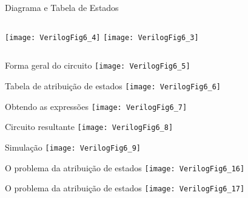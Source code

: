 \begin{frame}{Diagrama e Tabela de Estados} \centering
	\begin{columns}
        \vspace{3cm}
        \texttt{[image: VerilogFig6\_4]}
        \texttt{[image: VerilogFig6\_3]}
	\end{columns}
\end{frame}

\begin{frame}{Forma geral do circuito} \centering
    \texttt{[image: VerilogFig6\_5]} 
\end{frame}

\begin{frame}{Tabela de atribuição de estados} \centering
    \texttt{[image: VerilogFig6\_6]} 
\end{frame}

\begin{frame}{Obtendo as expressões} \centering
    \texttt{[image: VerilogFig6\_7]} 
\end{frame}

\begin{frame}{Circuito resultante} \centering
    \texttt{[image: VerilogFig6\_8]} 
\end{frame}

\begin{frame}{Simulação} \centering
    \texttt{[image: VerilogFig6\_9]} 
\end{frame}

\begin{frame}{O problema da atribuição de estados} \centering
    \texttt{[image: VerilogFig6\_16]} 
\end{frame}

\begin{frame}{O problema da atribuição de estados} \centering
    \texttt{[image: VerilogFig6\_17]} 
\end{frame}


